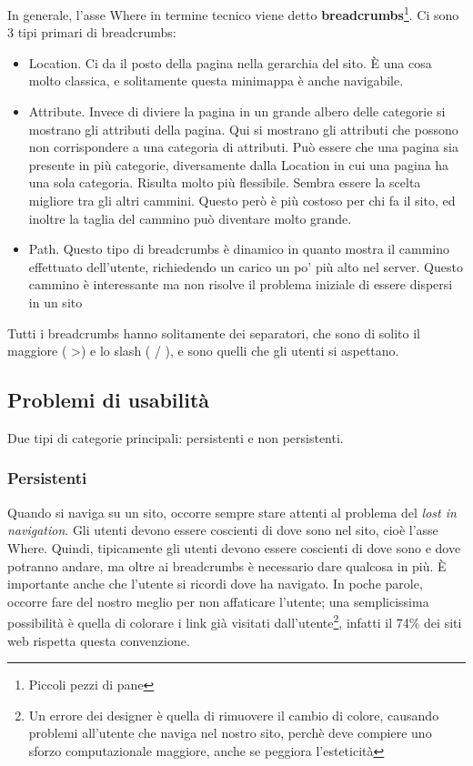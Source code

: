 In generale, l'asse Where in termine tecnico viene detto \textbf{breadcrumbs}\footnote{Piccoli pezzi di pane}. Ci sono 3 tipi primari di breadcrumbs:
\begin{itemize}

\item Location. Ci da il posto della pagina nella gerarchia del sito. \`E una cosa molto classica, e solitamente questa minimappa \`e anche navigabile.

\item Attribute. Invece di diviere la pagina in un grande albero delle categorie si mostrano gli attributi della pagina. Qui si mostrano gli attributi che possono non corrispondere a una categoria di attributi. Pu\`o essere che una pagina sia presente in pi\`u categorie, diversamente dalla Location in cui una pagina ha una sola categoria. Risulta molto pi\`u flessibile. Sembra essere la scelta migliore tra gli altri cammini. Questo per\`o \`e pi\`u costoso per chi fa il sito, ed inoltre la taglia del cammino pu\`o diventare molto grande.

\item Path. Questo tipo di breadcrumbs \`e dinamico in quanto mostra il cammino effettuato dell'utente, richiedendo un carico un po' pi\`u alto nel server. Questo cammino \`e interessante ma non risolve il problema iniziale di essere dispersi in un sito

\end{itemize}

Tutti i breadcrumbs hanno solitamente dei separatori, che sono di solito il maggiore ( \textgreater ) e lo slash ( / ), e sono quelli che gli utenti si aspettano.

\subsection{Problemi di usabilit\`a}

Due tipi di categorie principali: persistenti e non persistenti.

\subsubsection{Persistenti}

Quando si naviga su un sito, occorre sempre stare attenti al problema del \textit{lost in navigation}. Gli utenti devono essere coscienti di dove sono nel sito, cio\`e l'asse Where. Quindi, tipicamente gli utenti devono essere coscienti di dove sono e dove potranno andare, ma oltre ai breadcrumbs \`e necessario dare qualcosa in pi\`u. \`E importante anche che l'utente si ricordi dove ha navigato. In poche parole, occorre fare del nostro meglio per non affaticare l'utente; una semplicissima possibilit\`a \`e quella di colorare i link gi\`a visitati dall'utente\footnote{Un errore dei designer \`e quella di rimuovere il cambio di colore, causando problemi all'utente che naviga nel nostro sito, perch\`e deve compiere uno sforzo computazionale maggiore, anche se peggiora l'esteticit\`a}, infatti il 74\% dei siti web rispetta questa convenzione.


